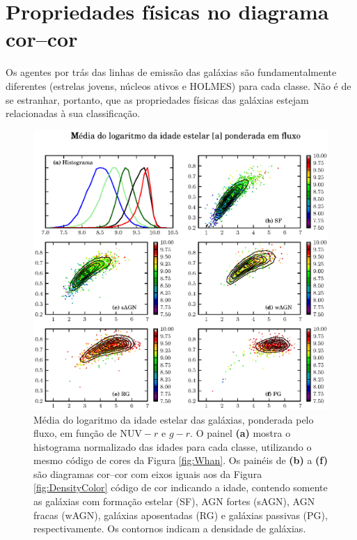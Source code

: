 
\section{Propriedades físicas no diagrama cor--cor}
\label{sec:Analise:PropFisicas}

Os agentes por trás das linhas de emissão das galáxias são fundamentalmente
diferentes (estrelas jovens, núcleos ativos e HOLMES) para cada classe. Não é de
se estranhar, portanto, que as propriedades físicas das galáxias estejam
relacionadas à sua classificação.

\begin{figure}
	\includegraphics{figuras/uvcolor-color-at_flux-byclass.eps}
	\caption[Idade estelar média ponderada em fluxo no diagrama cor--cor.]
	{Média do logaritmo da idade estelar das galáxias, ponderada pelo fluxo, em
	função de $\mathrm{NUV}-r$ e $g-r$. O painel \textbf{(a)} mostra o histograma
	normalizado das idades para cada classe, utilizando o mesmo código de cores da
	Figura \ref{fig:Whan}. Os painéis de \textbf{(b)} a \textbf{(f)} são diagramas
	cor--cor com eixos iguais aos da Figura \ref{fig:DensityColor} código de cor
	indicando a idade, contendo somente as galáxias com formação estelar (SF), AGN
	fortes (sAGN), AGN fracas (wAGN), galáxias aposentadas (RG) e galáxias passivas
	(PG), respectivamente. Os contornos indicam a densidade de galáxias.}
	\label{fig:ATFluxColor}
\end{figure}

